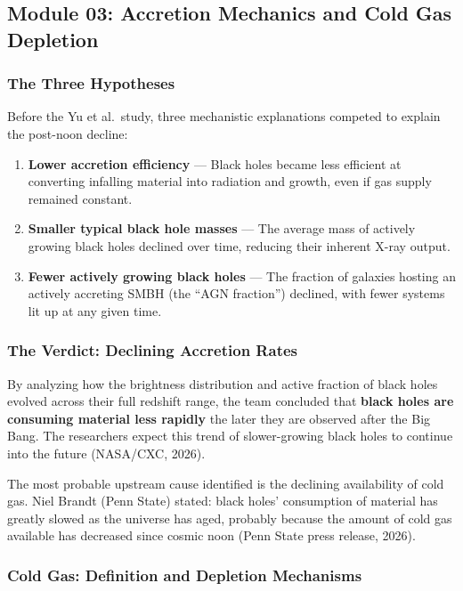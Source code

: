 \documentclass[11pt,letterpaper]{article}
\begin{document}
\subsection{Module 03: Accretion Mechanics and Cold Gas Depletion}

\subsubsection{The Three Hypotheses}

Before the Yu et al.\ study, three mechanistic explanations competed to explain the post-noon decline:

\begin{enumerate}
  \item \textbf{Lower accretion efficiency} --- Black holes became less efficient at converting infalling material into radiation and growth, even if gas supply remained constant.
  \item \textbf{Smaller typical black hole masses} --- The average mass of actively growing black holes declined over time, reducing their inherent X-ray output.
  \item \textbf{Fewer actively growing black holes} --- The fraction of galaxies hosting an actively accreting SMBH (the ``AGN fraction'') declined, with fewer systems lit up at any given time.
\end{enumerate}

\subsubsection{The Verdict: Declining Accretion Rates}

By analyzing how the brightness distribution and active fraction of black holes evolved across their full redshift range, the team concluded that \textbf{black holes are consuming material less rapidly} the later they are observed after the Big Bang. The researchers expect this trend of slower-growing black holes to continue into the future (NASA/CXC, 2026).

The most probable upstream cause identified is the declining availability of cold gas. Niel Brandt (Penn State) stated: black holes' consumption of material has greatly slowed as the universe has aged, probably because the amount of cold gas available has decreased since cosmic noon (Penn State press release, 2026).

\subsubsection{Cold Gas: Definition and Depletion Mechanisms}
\end{document}
